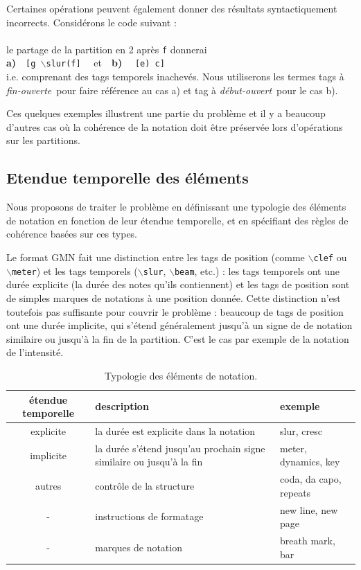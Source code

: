 \documentclass{article}
\newcommand{\code}[1]		{{\small \texttt{#1}}}
\newcommand{\gtag}[1]		{$\backslash$\code{#1}}
\newcommand{\oend}			{\emph{fin-ouverte}}
\newcommand{\obeg}			{\emph{début-ouvert}}
\newcommand{\codeindent}	{\\ \hspace*{9mm}}
\begin{document}
Certaines opérations peuvent également donner des résultats syntactiquement incorrects. Considérons le code suivant :
\codeindent \code{[g \gtag{slur}(f e) c]} \\
le partage de la partition en 2 après \code{f} donnerai 
\codeindent \textbf{a)}\ \ \code{[g \gtag{slur}(f]} \ \  et\ \ \textbf{b)} \ \  \code{[e) c]} \\
i.e. comprenant des tags temporels inachevés. Nous utiliserons les termes tags à \oend\ pour faire référence au cas a) et tag à \obeg\ pour le cas b).

Ces quelques exemples illustrent une partie du problème et il y a beaucoup d'autres cas où la cohérence de la notation doit être préservée lors d'opérations sur les partitions.

\subsection{Etendue temporelle des éléments}
Nous proposons de traiter le problème en définissant une typologie des éléments de notation en fonction de leur étendue temporelle, et en spécifiant des règles de cohérence basées sur ces types.

Le format GMN fait une distinction entre les tags de position (comme \gtag{clef} ou \gtag{meter}) et les tags temporels (\gtag{slur}, \gtag{beam}, etc.) : les tags temporels ont une durée explicite (la durée des notes qu'ils contiennent) et les tags de position sont de simples marques de notations à une position donnée. Cette distinction n'est toutefois pas suffisante pour couvrir le problème : beaucoup de tags de position ont une durée implicite, qui s'étend généralement jusqu'à un signe de de notation similaire ou jusqu'à la fin de la partition. C'est le cas par exemple de la notation de l'intensité.
\begin{table}[htdp]
\begin{center}
\begin{tabular}{cll}
étendue temporelle & description & exemple \\
\hline
explicite 	& la durée est explicite dans la notation	& slur, cresc \\
implicite 	& la durée s'étend jusqu'au prochain signe similaire ou jusqu'à la fin	& meter, dynamics, key \\
autres 		& contrôle de la structure			& coda, da capo, repeats\\
	- 		& instructions	 de formatage 	& new line, new page \\
	- 		& marques de notation & breath mark, bar \\
\hline
\end{tabular}
\end{center}
\caption{Typologie des éléments de notation.}
\label{types}
\end{table}
\end{document}
